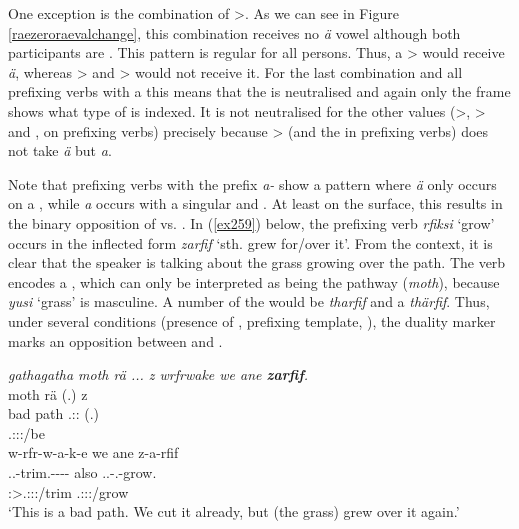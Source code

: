 One exception is the combination of \Sg>\Sg{}. As we can see in Figure \ref{raezeroraevalchange}, this combination receives no \emph{ä} vowel although both participants are . This pattern is regular for all persons. Thus, a \Pl>\Tsg{} would receive \emph{ä}, whereas \Du>\Tsg{} and \Sg>\Tsg{} would not receive it. For the last combination and all prefixing verbs with a \Tsg{} this means that the  is neutralised and again only the  frame shows what type of  is indexed. It is not neutralised for the other  values (\Sg>\Fsg{}, \Sg>\Ssg{} and \Fsg{}, \Ssg{} on prefixing verbs) precisely because \Sg>\Sg{} (and the \Sg{} in prefixing verbs) does not take \emph{ä} but \emph{a}.%

Note that prefixing verbs with the  prefix \emph{a-} show a pattern where \emph{ä} only occurs on a , while \emph{a} occurs with a singular and  . At least on the surface, this results in the binary opposition of  vs. . In (\ref{ex259}) below, the prefixing verb \emph{rfiksi} `grow' occurs in the inflected form \emph{zarfif} `sth. grew for/over it'. From the context, it is clear that the speaker is talking about the grass growing over the path. The verb encodes a  , which can only be interpreted as being the pathway (\emph{moth}), because \emph{yusi} `grass' is masculine. A  number of the  would be \emph{tharfif} and a  \emph{thärfif}. Thus, under several conditions (presence of , prefixing template, ), the duality marker marks an opposition between  and .

\begin{exe}
	\ex \emph{gathagatha moth rä ... z wrfrwake we ane \textbf{zarfif}.}\\
	 moth rä (.) z\\
	bad path \Tsg.\F:\Cop:\Ndu{} (.) \Iam{}\\
	{} {} \footnotesize{\Tsg.\F:\Sbj:\Nonpast:\Ipfv/be} {} {}\\
	\sn
	\glll w-rfr-w-a-k-e we ane z-a-rfif\\
	\Tsg.\F.\Alph-trim.\Ext-\Ndu-\Pst-\Lk-\Fnsg{} also \Dem{} \Tsg.\F.\Gam-\Ndu.\Vc-grow.\Rs\\
	\footnotesize{\Fpl:\Sbj>\Tsg.\F:\Obj:\Pst:\Ipfv/trim} {} {} \footnotesize{\Tsg.\F:\Io:\Rpst:\Pfv/grow}\\
	\trans `This is a bad path. We cut it already, but (the grass) grew over it again.'\\
	\label{ex259}
\end{exe}

